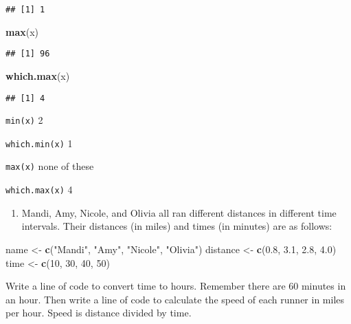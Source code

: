 \documentclass[]{article}
\newenvironment{Shaded}{\begin{snugshade}}{\end{snugshade}}
\newcommand{\DecValTok}[1]{\textcolor[rgb]{0.00,0.00,0.81}{#1}}
\newcommand{\FloatTok}[1]{\textcolor[rgb]{0.00,0.00,0.81}{#1}}
\newcommand{\KeywordTok}[1]{\textcolor[rgb]{0.13,0.29,0.53}{\textbf{#1}}}
\newcommand{\NormalTok}[1]{#1}
\newcommand{\StringTok}[1]{\textcolor[rgb]{0.31,0.60,0.02}{#1}}
\providecommand{\tightlist}{%
  \setlength{\itemsep}{0pt}\setlength{\parskip}{0pt}}
\begin{document}
\begin{verbatim}
## [1] 1
\end{verbatim}

\begin{Shaded}
\begin{Highlighting}[]
\KeywordTok{max}\NormalTok{(x)}
\end{Highlighting}
\end{Shaded}

\begin{verbatim}
## [1] 96
\end{verbatim}

\begin{Shaded}
\begin{Highlighting}[]
\KeywordTok{which.max}\NormalTok{(x)}
\end{Highlighting}
\end{Shaded}

\begin{verbatim}
## [1] 4
\end{verbatim}

\texttt{min(x)} 2

\texttt{which.min(x)} 1

\texttt{max(x)} none of these

\texttt{which.max(x)} 4

\begin{enumerate}
\def\labelenumi{\arabic{enumi}.}
\setcounter{enumi}{2}
\tightlist
\item
  Mandi, Amy, Nicole, and Olivia all ran different distances in
  different time intervals. Their distances (in miles) and times (in
  minutes) are as follows:
\end{enumerate}

\begin{Shaded}
\begin{Highlighting}[]
\NormalTok{name <-}\StringTok{ }\KeywordTok{c}\NormalTok{(}\StringTok{"Mandi"}\NormalTok{, }\StringTok{"Amy"}\NormalTok{, }\StringTok{"Nicole"}\NormalTok{, }\StringTok{"Olivia"}\NormalTok{)}
\NormalTok{distance <-}\StringTok{ }\KeywordTok{c}\NormalTok{(}\FloatTok{0.8}\NormalTok{, }\FloatTok{3.1}\NormalTok{, }\FloatTok{2.8}\NormalTok{, }\FloatTok{4.0}\NormalTok{)}
\NormalTok{time <-}\StringTok{ }\KeywordTok{c}\NormalTok{(}\DecValTok{10}\NormalTok{, }\DecValTok{30}\NormalTok{, }\DecValTok{40}\NormalTok{, }\DecValTok{50}\NormalTok{)}
\end{Highlighting}
\end{Shaded}

Write a line of code to convert time to hours. Remember there are 60
minutes in an hour. Then write a line of code to calculate the speed of
each runner in miles per hour. Speed is distance divided by time.
\end{document}
